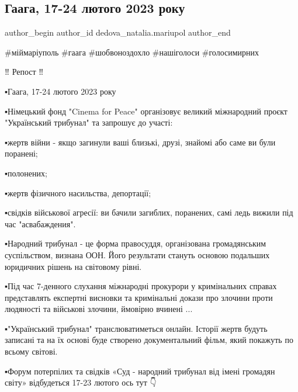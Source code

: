  
 
 
 
 

\subsection{Гаага, 17-24 лютого 2023 року}
\label{sec:24_01_2023.fb.dedova_natalia.mariupol.2.gaaga__17_24_lyutogo}

\ifcmt
 author_begin
   author_id dedova_natalia.mariupol
 author_end
\fi

\#міймаріуполь
\#гаага
\#шобвоноздохло
\#нашіголоси
\#голосимирних

‼️ Репост ‼️

▪️Гаага, 17-24 лютого 2023 року

▪️Німецький фонд "Cinema for Peace" організовує великий міжнародний проєкт
"Український трибунал" та запрошує до участі:

▪️жертв війни - якщо загинули ваші близькі, друзі, знайомі або саме ви були
поранені;

▪️полонених;

▪️жертв фізичного насильства, депортації; 

▪️свідків військової агресії: ви бачили загиблих, поранених, самі ледь вижили
під час "асвабаждения". 

▪️Народний трибунал - це форма правосуддя, організована громадянським
суспільством, визнана ООН. Його результати стануть основою подальших юридичних
рішень на світовому рівні.

▪️Під час 7-денного слухання міжнародні прокурори у кримінальних справах
представлять експертні висновки та кримінальні докази про злочини проти
людяності та військові злочини, ймовірно вчинені ... 

▪️"Український трибунал" транслюватиметься онлайн. Історії жертв будуть записані
та на їх основі буде створено документальний фільм, який покажуть по всьому
світові.

▪️Форум потерпілих та свідків «Суд - народний трибунал від імені громадян світу»
відбудеться 17-23 лютого ось тут 👇
